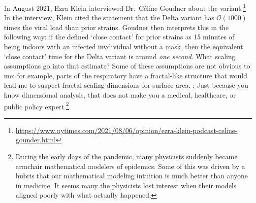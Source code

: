 \begin{exercise}
In August 2021, Ezra Klein interviewed Dr.~C\'eline Goudner about the  variant.\footnote{\url{https://www.nytimes.com/2021/08/06/opinion/ezra-klein-podcast-celine-gounder.html}} In the interview, Klein cited the statement that the Delta variant has $\mathcal O(1000)$ times the viral load than prior  strains. Goudner then interprets this in the following way: if the  defined `close contact' for prior strains as 15 minutes of being indoors with an infected invdividual without a mask, then the equivalent `close contact' time for the Delta variant is around \emph{one second}. What scaling assumptions go into that estimate? Some of these assumptions are not obvious to me: for example, parts of the respiratory have a fractal-like structure that would lead me to suspect fractal scaling dimensions for surface area. : Just because you know dimensional analysis, that does not make you a medical, healthcare, or public policy expert.\footnote{During the early days of the  pandemic, many physicists suddenly became armchair mathematical modelers of epidemics. Some of this was driven by a hubris that our mathematical modeling intuition is much better than anyone in medicine. It seems many the physicists lost interest when their models aligned poorly with what actually happened.} 
\end{exercise}
